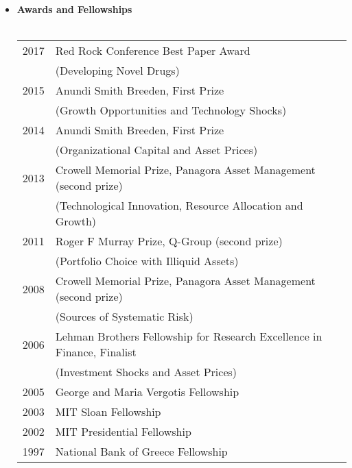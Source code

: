 \documentclass[12pt,letterpaper,serif,overlapped]{res}
\begin{document}
\begin{resume}
\begin{itemize}
\item \textbf{Awards and Fellowships}\\ \\
\begin{tabular}{ll}
2017 & Red Rock Conference Best Paper Award \\ &  (Developing Novel Drugs)\\
2015 & Anundi Smith Breeden, First Prize\\ &  (Growth Opportunities and Technology Shocks)\\
2014 & Anundi Smith Breeden, First Prize \\ & (Organizational Capital and Asset Prices)\\
2013 & Crowell Memorial Prize, Panagora Asset Management (second prize)\\& (Technological Innovation, Resource Allocation and Growth)\\
2011 & Roger F Murray Prize, Q-Group (second prize)\\ & (Portfolio Choice with Illiquid Assets)\\
2008 & Crowell Memorial Prize, Panagora Asset Management (second prize) \\ & (Sources of Systematic Risk) \\
2006  & Lehman Brothers Fellowship for Research Excellence in Finance, Finalist\\ & (Investment Shocks and Asset Prices)\\
2005 & George and Maria Vergotis Fellowship\\
2003& MIT Sloan Fellowship\\
2002 & MIT Presidential Fellowship\\
1997 & National Bank of Greece Fellowship \\
\end{tabular}

\end{itemize}



\end{resume}
\end{document}
